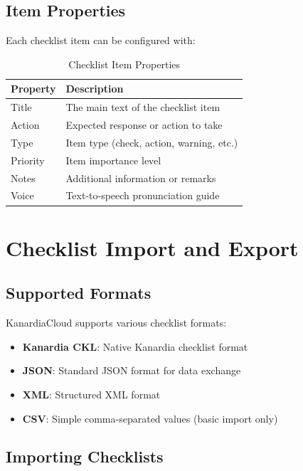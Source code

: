 \subsection{Item Properties}

Each checklist item can be configured with:

\begin{table}[H]
\centering
\begin{tabular}{@{}lp{8cm}@{}}
\toprule
\textbf{Property} & \textbf{Description} \\
\midrule
Title & The main text of the checklist item \\
Action & Expected response or action to take \\
Type & Item type (check, action, warning, etc.) \\
Priority & Item importance level \\
Notes & Additional information or remarks \\
Voice & Text-to-speech pronunciation guide \\
\bottomrule
\end{tabular}
\caption{Checklist Item Properties}
\label{tab:item_properties}
\end{table}

\section{Checklist Import and Export}

\subsection{Supported Formats}

KanardiaCloud supports various checklist formats:

\begin{itemize}
    \item \textbf{Kanardia CKL}: Native Kanardia checklist format
    \item \textbf{JSON}: Standard JSON format for data exchange
    \item \textbf{XML}: Structured XML format
    \item \textbf{CSV}: Simple comma-separated values (basic import only)
\end{itemize}

\subsection{Importing Checklists}

